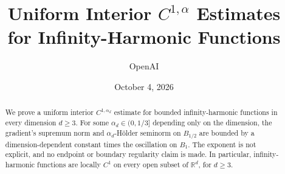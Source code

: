 \documentclass[11pt]{article}
\title{Uniform Interior $C^{1,\alpha}$ Estimates\\
for Infinity-Harmonic Functions}
\author{OpenAI}
\date{October 4, 2026}
\numberwithin{equation}{section}
\theoremstyle{definition}
\theoremstyle{remark}
\begin{document}
\maketitle

\begin{abstract}
We prove a uniform interior $C^{1,\alpha_d}$ estimate for bounded
infinity-harmonic functions in every dimension $d\ge3$. For some
$\alpha_d\in(0,1/3]$ depending only on the dimension, the gradient's
supremum norm and $\alpha_d$-H\"older seminorm on $B_{1/2}$ are bounded
by a dimension-dependent constant times the oscillation on $B_1$.
The exponent is not explicit, and no endpoint or boundary regularity
claim is made. In particular, infinity-harmonic functions are locally
$C^1$ on every open subset of $\mathbb{R}^d$, for $d\ge3$.
\end{abstract}

\tableofcontents










\end{document}
